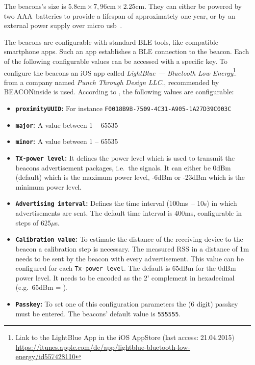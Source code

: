 The beacons's size is $5.8\text{cm} \times 7,96\text{cm} \times 2.25\text{cm}$. They can either be powered by two AAA~batteries to provide a lifespan of approximately one year, or by an external power supply over micro usb~\citep{binside:ds}.

The beacons are configurable with standard \ac{BLE} tools, like compatible smartphone apps. Such an app establishes a \ac{BLE} connection to the beacon. Each of the following configurable values can be accessed with a specific key. To configure the beacons an iOS app called \emph{LightBlue --- Bluetooth Low Energy}\footnote{Link to the LightBlue App in the iOS AppStore (last access: 21.04.2015) \url{https://itunes.apple.com/de/app/lightblue-bluetooth-low-energy/id557428110}} from a company named \emph{Punch Through Design LLC.}, recommended by BEACONinside is used. According to \citet{binside:ds}, the following values are configurable:
\begin{itemize}
  \item \textbf{\texttt{proximityUUID}:} For instance \texttt{F0018B9B-7509-4C31-A905-1A27D39C003C}
  \item \textbf{\texttt{major}:} A value between 1 -- 65535
  \item \textbf{\texttt{minor}:} A value between 1 -- 65535
  \item \textbf{\texttt{\acs{TX}-power level}:} It defines the power level which is used to transmit the beacons advertisement packages, i.e.\ the signals. It can either be 0dBm (default) which is the maximum power level, -6dBm or -23dBm which is the minimum power level.
  \item \textbf{\texttt{Advertising interval}:} Defines the time interval (100ms~-- 10s) in which advertisements are sent. The default time interval is 400ms, configurable in steps of 625$\mu$s.
  \item \textbf{\texttt{Calibration value}:} To estimate the distance of the receiving device to the beacon a calibration step is necessary. The measured \acs{RSS} in a distance of 1m needs to be sent by the beacon with every advertisement. This value can be configured for each \texttt{Tx-power level}. The default is 65dBm for the 0dBm power level. It needs to be encoded as the 2' complement in hexadecimal (e.g.\ 65dBm = ).
  \item \textbf{\texttt{Passkey}:} To set one of this configuration parameters the (6 digit) passkey must be entered. The beacons' default value is \texttt{555555}.
\end{itemize}

